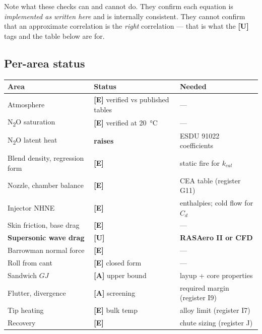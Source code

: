 \documentclass[11pt,a4paper]{article}
\newcommand{\established}{\textcolor{okgreen}{\textbf{[E]}}\xspace}
\newcommand{\approxi}{\textcolor{amber}{\textbf{[A]}}\xspace}
\newcommand{\unvalidated}{\textcolor{danger}{\textbf{[U]}}\xspace}
\begin{document}
\medskip
\noindent
Note what these checks can and cannot do. They confirm each equation is
\emph{implemented as written here} and is internally consistent. They cannot
confirm that an approximate correlation is the \emph{right} correlation --- that
is what the \unvalidated{} tags and the table below are for.

\subsection*{Per-area status}

\begin{center}
\begin{tabular}{@{}lll@{}}
\toprule
Area & Status & Needed \\
\midrule
Atmosphere & \established{} verified vs published tables & --- \\
N\textsubscript{2}O saturation & \established{} verified at \SI{20}{\celsius} & --- \\
N\textsubscript{2}O latent heat & \textbf{raises} & ESDU 91022 coefficients \\
Blend density, regression form & \established{} & static fire for $k_{cal}$ \\
Nozzle, chamber balance & \established{} & CEA table (register G11) \\
Injector NHNE & \established{} & enthalpies; cold flow for $C_d$ \\
Skin friction, base drag & \established{} & --- \\
\textbf{Supersonic wave drag} & \unvalidated & \textbf{RASAero II or CFD} \\
Barrowman normal force & \established{} & --- \\
Roll from cant & \established{} closed form & --- \\
Sandwich $GJ$ & \approxi{} upper bound & layup + core properties \\
Flutter, divergence & \approxi{} screening & required margin (register I9) \\
Tip heating & \established{} bulk temp & alloy limit (register I7) \\
Recovery & \established{} & chute sizing (register J) \\
\bottomrule
\end{tabular}
\end{center}

\medskip
\noindent
{}
\end{document}
